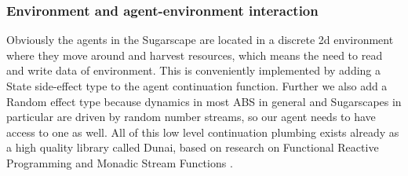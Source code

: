 \subsubsection{Environment and agent-environment interaction}
Obviously the agents in the Sugarscape are located in a discrete 2d environment where they move around and harvest resources, which means the need to read and write data of environment. This is conveniently implemented by adding a State side-effect type to the agent continuation function. Further we also add a Random effect type because dynamics in most ABS in general and Sugarscapes in particular are driven by random number streams, so our agent needs to have access to one as well. All of this low level continuation plumbing exists already as a high quality library called Dunai, based on research on Functional Reactive Programming  \cite{hudak_arrows_2003} and Monadic Stream Functions \cite{perez_functional_2016,perez_extensible_2017}.